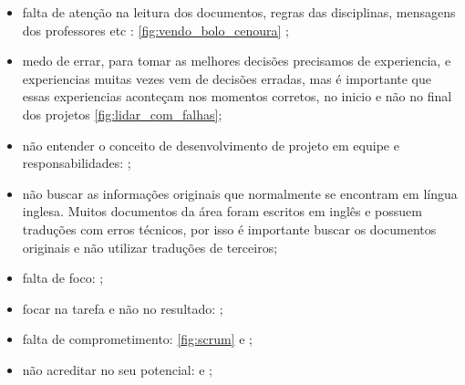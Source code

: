 \begin{itemize}
    \item falta de atenção na leitura dos documentos, regras das disciplinas, mensagens dos professores etc : \autoref{fig:vendo_bolo_cenoura} \cite{atencao_leitura_vendo_bolo_cenoura};
    
    \item medo de errar, para tomar as melhores decisões precisamos de experiencia, e experiencias muitas vezes vem de decisões erradas, mas é importante que essas experiencias aconteçam nos momentos corretos, no inicio e não no final dos projetos \cite{decisions_experience-1} \cite{decisions_experience-2} \autoref{fig:lidar_com_falhas};

    \item não entender o conceito de desenvolvimento de projeto em equipe e responsabilidades: 
    ;
    
    \item não buscar as informações originais que normalmente se encontram em língua inglesa. Muitos documentos da área foram escritos em inglês e possuem traduções com erros técnicos, por isso é importante buscar os documentos originais e não utilizar traduções de terceiros;
    
    \item falta de foco: 
    ;
    
    \item focar na tarefa e não no resultado:
    ;
    
    \item falta de comprometimento: 
    \autoref{fig:scrum} e 
    ;

    \item não acreditar no seu potencial: 
    e
    ;
    

\end{itemize}

